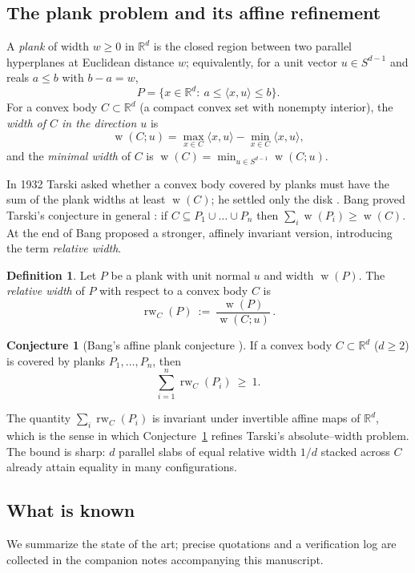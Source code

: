\documentclass[11pt,reqno]{amsart}
\theoremstyle{plain}
\theoremstyle{definition}
\newtheorem{conjecture}[theorem]{Conjecture}
\newtheorem{definition}[theorem]{Definition}
\newcommand{\R}{\mathbb{R}}
\newcommand{\inner}[2]{\langle #1, #2\rangle}
\newcommand{\relw}{\operatorname{rw}}
\newcommand{\wid}{\operatorname{w}}
\begin{document}
\subsection{The plank problem and its affine refinement}
A \emph{plank} of width $w\ge 0$ in $\R^d$ is the closed region between two
parallel hyperplanes at Euclidean distance $w$; equivalently, for a unit vector
$u\in S^{d-1}$ and reals $a\le b$ with $b-a=w$,
\[
P=\{x\in\R^d:\ a\le \inner{x}{u}\le b\}.
\]
For a convex body $C\subset\R^d$ (a compact convex set with nonempty interior),
the \emph{width of $C$ in the direction $u$} is
\[
\wid(C;u)=\max_{x\in C}\inner{x}{u}-\min_{x\in C}\inner{x}{u},
\]
and the \emph{minimal width} of $C$ is $\wid(C)=\min_{u\in S^{d-1}}\wid(C;u)$.

In 1932 Tarski asked whether a convex body covered by planks must have the sum of
the plank widths at least $\wid(C)$; he settled only the disk
\cite{Tarski1932}. Bang proved Tarski's conjecture in general
\cite{Bang1951}: if $C\subseteq P_1\cup\dots\cup P_n$ then
$\sum_i \wid(P_i)\ge \wid(C)$. At the end of \cite{Bang1951} Bang proposed a
stronger, affinely invariant version, introducing the term \emph{relative width}.

\begin{definition}\label{def:relw}
Let $P$ be a plank with unit normal $u$ and width $\wid(P)$. The \emph{relative
width} of $P$ with respect to a convex body $C$ is
\[
\relw_C(P)\ :=\ \frac{\wid(P)}{\wid(C;u)}\,.
\]
\end{definition}

\begin{conjecture}[Bang's affine plank conjecture {\cite{Bang1951}}]
\label{conj:bang}
If a convex body $C\subset\R^d$ ($d\ge2$) is covered by planks
$P_1,\dots,P_n$, then
\[
\sum_{i=1}^{n}\relw_C(P_i)\ \ge\ 1 .
\]
\end{conjecture}

The quantity $\sum_i\relw_C(P_i)$ is invariant under invertible affine maps of
$\R^d$, which is the sense in which Conjecture~\ref{conj:bang} refines Tarski's
absolute--width problem. The bound is sharp: $d$ parallel slabs of equal relative
width $1/d$ stacked across $C$ already attain equality in many configurations.

\subsection{What is known}\label{subsec:known}
We summarize the state of the art; precise quotations and a verification log are
collected in the companion notes accompanying this manuscript.
\end{document}

